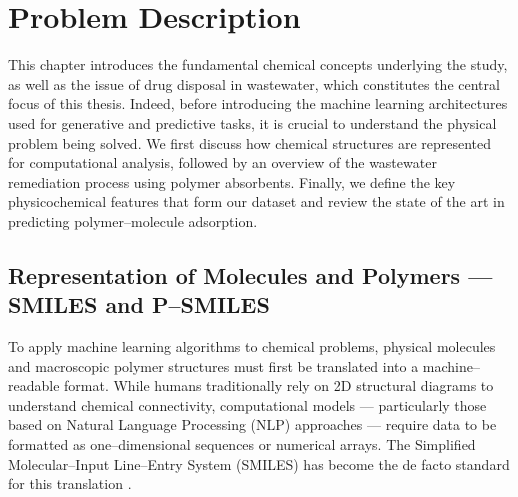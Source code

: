 \chapter{Problem Description}

This chapter introduces the fundamental chemical concepts underlying the study, as well as the issue of drug disposal in wastewater, which constitutes the central focus of this thesis. Indeed, before introducing the machine learning architectures used for generative and predictive tasks, it is crucial to understand the physical problem being solved. We first discuss how chemical structures are represented for computational analysis, followed by an overview of the wastewater remediation process using polymer absorbents. Finally, we define the key physicochemical features that form our dataset and review the state of the art in predicting polymer--molecule adsorption.


\section{Representation of Molecules and Polymers --- SMILES and P--SMILES}
\label{sec:smiles_and_psmiles}

To apply machine learning algorithms to chemical problems, physical molecules and macroscopic polymer structures must first be translated into a machine--readable format. While humans traditionally rely on 2D structural diagrams to understand chemical connectivity, computational models — particularly those based on Natural Language Processing (NLP) approaches — require data to be formatted as one--dimensional sequences or numerical arrays. The Simplified Molecular--Input Line--Entry System (SMILES) has become the de facto standard for this translation \cite{weininger1988smiles}.

